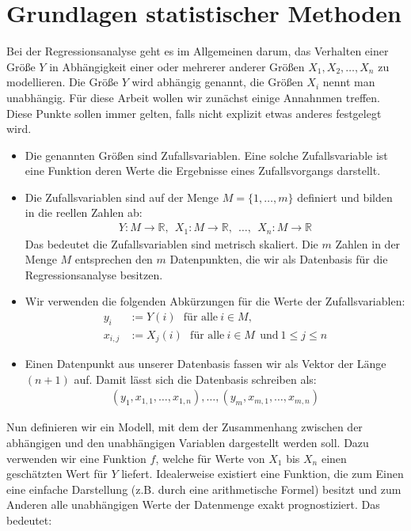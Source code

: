 \chapter{Grundlagen statistischer Methoden}

Bei der Regressionsanalyse geht es im Allgemeinen darum, das Verhalten einer Größe $Y$ in Abhängigkeit einer oder mehrerer anderer Größen $X_1, X_2, \dots, X_n$ zu modellieren. Die Größe $Y$ wird abhängig genannt, die Größen $X_i$ nennt man unabhängig. Für diese Arbeit wollen wir zunächst einige Annahnmen treffen. Diese Punkte sollen immer gelten, falls nicht explizit etwas anderes festgelegt wird.
\begin{itemize}
    \item Die genannten Größen sind Zufallsvariablen. Eine solche Zufallsvariable ist eine Funktion deren Werte die Ergebnisse eines Zufallsvorgangs darstellt.
    \item Die Zufallsvariablen sind auf der Menge $M = \{1, \dots, m\}$ definiert und bilden in die reellen Zahlen ab:
    \begin{align*}
        Y: M \rightarrow \mathbb{R},~~ X_1: M \rightarrow \mathbb{R},~~ \dots,~~ X_n: M \rightarrow \mathbb{R}
    \end{align*}
    Das bedeutet die Zufallsvariablen sind metrisch skaliert. Die $m$ Zahlen in der Menge $M$ entsprechen den $m$ Datenpunkten, die wir als Datenbasis für die Regressionsanalyse besitzen.
    \item Wir verwenden die folgenden Abkürzungen für die Werte der Zufallsvariablen:
    \begin{align*}
        y_i &:= Y(i) ~~~\text{für alle}~ i \in M,\\
        x_{i, j} &:= X_j(i) ~~~\text{für alle}~ i \in M ~~\text{und}~ 1 \leq j \leq n
    \end{align*}
    \item Einen Datenpunkt aus unserer Datenbasis fassen wir als Vektor der Länge $(n + 1)$ auf. Damit lässt sich die Datenbasis schreiben als:
    \begin{align*}
        (y_1, x_{1,1}, \dots, x_{1,n}), \dots, (y_m, x_{m,1}, \dots, x_{m,n})
    \end{align*}
\end{itemize}
Nun definieren wir ein Modell, mit dem der Zusammenhang zwischen der abhängigen und den unabhängigen Variablen dargestellt werden soll. Dazu verwenden wir eine Funktion $f$, welche für Werte von  $X_1$ bis $X_n$ einen geschätzten Wert für $Y$ liefert. Idealerweise existiert eine Funktion, die zum Einen eine einfache Darstellung (z.B. durch eine arithmetische Formel) besitzt und zum Anderen alle unabhängigen Werte der Datenmenge exakt prognostiziert. Das bedeutet:

